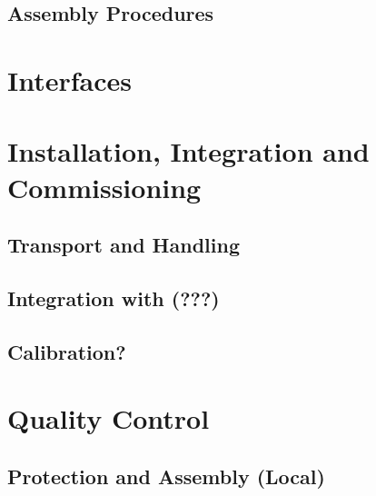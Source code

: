 \subsection{Assembly Procedures}
\label{sec:fddp-install-assy}



\section{Interfaces}
\label{sec:fddp-install-intfc}





\section{Installation, Integration and Commissioning}
\label{sec:fddp-install-install}


\subsection{Transport and Handling}
\label{sec:fddp-install-install-transport}


\subsection{Integration with (???)}
\label{sec:fddp-install-install-integ}


\subsection{Calibration?}
\label{sec:fddp-install-install-calib}



\section{Quality Control}
\label{sec:fddp-install-qc}

\subsection{Protection and Assembly (Local)}
\label{sec:fddp-install-qc-local}



